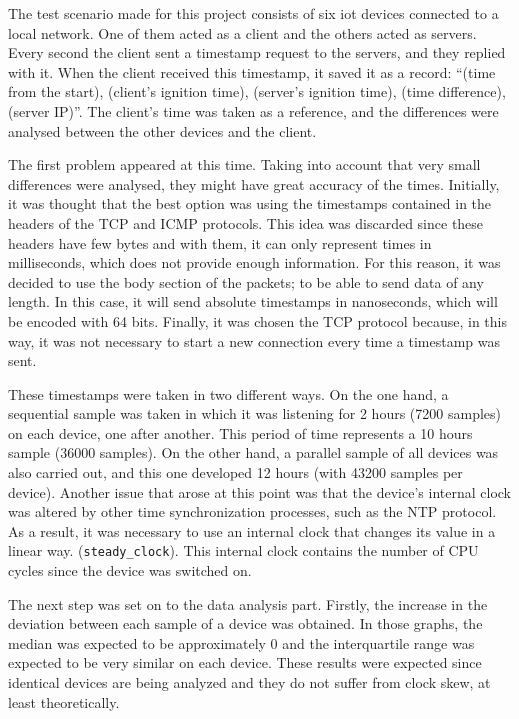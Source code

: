 The test scenario made for this project consists of six \acrshort{iot} devices connected to a local network. One of them acted as a client and the others acted as servers. Every second the client sent a timestamp request to the servers, and they replied with it. When the client received this timestamp, it saved it as a record: ``(time from the start), (client's ignition time), (server's ignition time), (time difference), (server IP)''. The client's time was taken as a reference, and the differences were analysed between the other devices and the client.


The first problem appeared at this time. Taking into account that very small differences were analysed, they might have great accuracy of the times. Initially, it was thought that the best option was using the timestamps contained in the headers of the TCP and ICMP protocols. This idea was discarded since these headers have few bytes and with them, it can only represent times in milliseconds, which does not provide enough information. For this reason, it was decided to use the body section of the packets; to be able to send data of any length. In this case, it will send absolute timestamps in nanoseconds, which will be encoded with 64 bits. Finally, it was chosen the TCP protocol because, in this way, it was not necessary to start a new connection every time a timestamp was sent.


These timestamps were taken in two different ways. On the one hand, a sequential sample was taken in which it was listening for 2 hours (7200 samples) on each device, one after another. This period of time represents a 10 hours sample (36000 samples). On the other hand, a parallel sample of all devices was also carried out, and this one developed 12 hours (with 43200 samples per device). Another issue that arose at this point was that the device's internal clock was altered by other time synchronization processes, such as the NTP protocol. As a result, it was necessary to use an internal clock that changes its value in a linear way. (\texttt{steady\_clock}). This internal clock contains the number of CPU cycles since the device was switched on.

The next step was set on to the data analysis part. Firstly, the increase in the deviation between each sample of a device was obtained. In those graphs, the median was expected to be approximately 0 and the interquartile range was expected to be very similar on each device. These results were expected since identical devices are being analyzed and they do not suffer from clock skew, at least theoretically.

